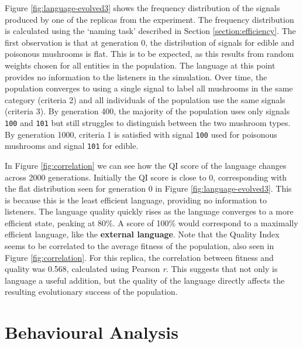 \documentclass[12pt,a4paper,twoside,openright]{report}
\begin{document}
Figure \ref{fig:language-evolved3} shows the frequency distribution of the signals produced by one of the replicas from the experiment. The frequency distribution is calculated using the `naming task' described in Section \ref{section:efficiency}. The first observation is that at generation 0, the distribution of signals for edible and poisonous mushrooms is flat. This is to be expected, as this results from random weights chosen for all entities in the population. The language at this point provides no information to the listeners in the simulation. Over time, the population converges to using a single signal to label all mushrooms in the same category (criteria 2) and all individuals of the population use the same signals (criteria 3). By generation 400, the majority of the population uses only signals \verb~100~ and \verb~101~ but still struggles to distinguish between the two mushroom types. By generation 1000, criteria 1 is satisfied with signal \verb~100~ used for poisonous mushrooms and signal \verb~101~ for edible. 

In Figure \ref{fig:correlation} we can see how the QI score of the language changes across 2000 generations. Initially the QI score is close to 0, corresponding with the flat distribution seen for generation 0 in Figure \ref{fig:language-evolved3}. This is because this is the least efficient language, providing no information to listeners. The language quality quickly rises as the language converges to a more efficient state, peaking at 80\%. A score of 100\% would correspond to a maximally efficient language, like the {\bf external language}. Note that the Quality Index seems to be correlated to the average fitness of the population, also seen in Figure \ref{fig:correlation}. For this replica, the correlation between fitness and quality was 0.568, calculated using Pearson \emph{r}. This suggests that not only is language a useful addition, but the quality of the language directly affects the resulting evolutionary success of the population.


\section{Behavioural Analysis}\label{section:behaviouranalysis}
\end{document}
